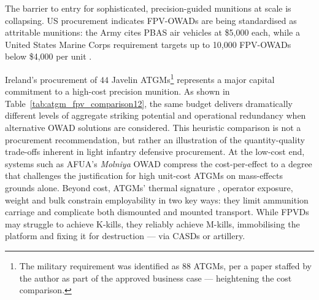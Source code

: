 \begin{table}[H]
	\centering
	
	\par\smallskip
	
	
	\caption[Javelin versus FPV-OWAD cost comparison]{Cost and Range Ratios (exclusive of VAT): Javelin versus Fibre-Optic FPV-OWAD, per \textcite{erikdavis_participant_7} and \textcite[187]{Javelin_range}}\label{javcost1}
\end{table}

The barrier to entry for sophisticated, precision-guided munitions at scale is collapsing. US procurement indicates FPV-OWADs are being standardised as attritable munitions: the Army cites PBAS air vehicles at \$5,000 each, while a United States Marine Corps requirement targets up to 10,000 FPV-OWADs below \$4,000 per unit \parencite{us_army_2025_fpv_training_germany_2025-07_25,sam_2025_contract_fpv_2025_12_18}.

Ireland's procurement of $44$ Javelin ATGMs\footnote{The military requirement was identified as $88$ ATGMs, per a paper staffed by the author as part of the approved business case --- heightening the cost comparison.} represents a major capital commitment to a high-cost precision munition. As shown in Table~\ref{tab:atgm_fpv_comparison12}, the same budget delivers dramatically different levels of aggregate striking potential and operational redundancy when alternative OWAD solutions are considered. This heuristic comparison is not a procurement recommendation, but rather an illustration of the quantity-quality trade-offs inherent in light infantry defensive procurement. At the low-cost end, systems such as AFUA's \textit{Molniya} OWAD compress the cost-per-effect to a degree that challenges the justification for high unit-cost ATGMs on mass-effects grounds alone. Beyond cost, ATGMs' thermal signature \parencite[22]{MOLLOY_2024}, operator exposure, weight and bulk constrain employability in two key ways: they limit ammunition carriage and complicate both dismounted and mounted transport. While FPVDs may struggle to achieve K-kills, they reliably achieve M-kills, immobilising the platform and fixing it for destruction --- via CASDs or artillery.

